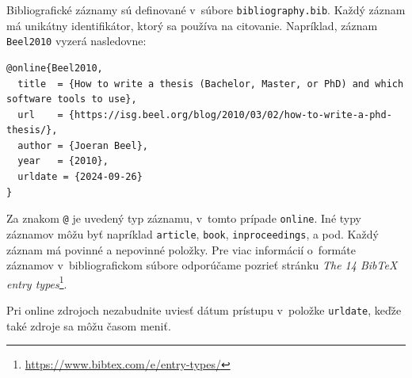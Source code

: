 Bibliografické záznamy sú definované v~súbore \texttt{bibliography.bib}. Každý záznam má unikátny identifikátor, ktorý sa používa na citovanie. Napríklad, záznam \texttt{Beel2010} vyzerá nasledovne:


\begin{lstlisting}[breaklines=true, prebreak=\mbox{\textcolor{red}{$\hookleftarrow$}}]
@online{Beel2010,
  title  = {How to write a thesis (Bachelor, Master, or PhD) and which software tools to use},
  url    = {https://isg.beel.org/blog/2010/03/02/how-to-write-a-phd-thesis/},
  author = {Joeran Beel},
  year   = {2010},
  urldate = {2024-09-26}
}
\end{lstlisting}

Za znakom \texttt{@} je uvedený typ záznamu, v~tomto prípade \texttt{online}. Iné typy záznamov môžu byť napríklad \texttt{article}, \texttt{book}, \texttt{inproceedings}, a pod. Každý záznam má povinné a nepovinné položky. Pre viac informácií o~formáte záznamov v~bibliografickom súbore odporúčame pozrieť stránku \emph{The 14 BibTeX entry types}\footnote{\url{https://www.bibtex.com/e/entry-types/}}.

Pri online zdrojoch nezabudnite uviesť dátum prístupu v~položke \texttt{urldate}, keďže také zdroje sa môžu časom meniť.
